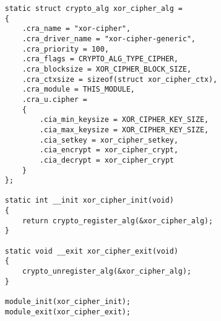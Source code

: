 \begin{verbatim}
static struct crypto_alg xor_cipher_alg =
{
    .cra_name = "xor-cipher",
    .cra_driver_name = "xor-cipher-generic",
    .cra_priority = 100,
    .cra_flags = CRYPTO_ALG_TYPE_CIPHER,
    .cra_blocksize = XOR_CIPHER_BLOCK_SIZE,
    .cra_ctxsize = sizeof(struct xor_cipher_ctx),
    .cra_module = THIS_MODULE,
    .cra_u.cipher =
    {
        .cia_min_keysize = XOR_CIPHER_KEY_SIZE,
        .cia_max_keysize = XOR_CIPHER_KEY_SIZE,
        .cia_setkey = xor_cipher_setkey,
        .cia_encrypt = xor_cipher_crypt,
        .cia_decrypt = xor_cipher_crypt
    }
};

static int __init xor_cipher_init(void)
{
    return crypto_register_alg(&xor_cipher_alg);
}

static void __exit xor_cipher_exit(void)
{
    crypto_unregister_alg(&xor_cipher_alg);
}

module_init(xor_cipher_init);
module_exit(xor_cipher_exit);
\end{verbatim}
